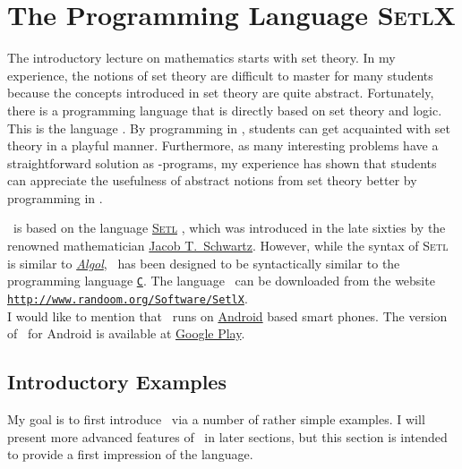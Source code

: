 \chapter{The Programming Language \textsc{SetlX}}
The introductory lecture on mathematics starts with set theory.  In my experience, the notions of
set theory are difficult to master for many students because the concepts introduced in set theory
are quite abstract.  Fortunately, there is a programming language that is directly based on set
theory and logic.  This is the language \href{http://www.randoom.org/Software/SetlX}{\setl}.
By programming in \setl, students can get acquainted with set theory in a playful manner.
Furthermore, as many interesting problems have a straightforward solution as \setl-programs,
my experience has shown that students can appreciate the usefulness of abstract notions from set
theory better by programming in \setl.

\setl\ is based on the language \href{https://en.wikipedia.org/wiki/SETL}{\textsc{Setl}} \cite{setl86}, which
was introduced in the late sixties by the renowned mathematician 
\href{https://en.wikipedia.org/wiki/Jacob_T._Schwartz}{Jacob T.~Schwartz}.  
However, while the syntax of \textsc{Setl} is similar to   
\href{https://en.wikipedia.org/wiki/ALGOL}{\textsl{Algol}}, \setl\ has been designed to be
syntactically similar to the programming language
\href{https://en.wikipedia.org/wiki/C_(programming_language)}{\texttt{C}}. 
The language \setl\ can be downloaded from the website
\\[0.2cm]
\hspace*{1.3cm}
\href{http://www.randoom.org/Software/SetlX}{\texttt{http://www.randoom.org/Software/SetlX}}.
\\[0.2cm]
I would like to mention that \setl\ runs on
\href{https://en.wikipedia.org/wiki/Android_(operating_system)}{Android}
based smart phones.  The version of \setl\ for Android  is available at
\href{https://play.google.com/store/apps/details?id=org.randoom.setlxUI.android&hl=en}{Google Play}.

\section{Introductory Examples}
My goal is to first introduce \setl\ via a number of rather simple examples.  I will present more
advanced features of \setl\ in later sections, but this section is intended to provide a first
impression of the language.


